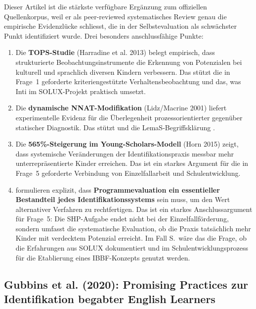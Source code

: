 \documentclass[ngerman, a4paper]{article}
\begin{document}
Dieser Artikel ist die stärkste verfügbare Ergänzung zum offiziellen
Quellenkorpus, weil er als peer-reviewed systematisches Review genau die
empirische Evidenzlücke schliesst, die in der Selbstevaluation als
schwächster Punkt identifiziert wurde. Drei besonders anschlussfähige
Punkte:

\begin{enumerate}
  \item Die \textbf{TOPS-Studie} (Harradine et al. 2013) belegt
    empirisch, dass strukturierte Beobachtungsinstrumente die Erkennung
    von Potenzialen bei kulturell und sprachlich diversen Kindern
    verbessern. Das stützt die in Frage~1 geforderte kriteriengestützte
    Verhaltensbeobachtung und das, was Inti im SOLUX-Projekt praktisch
    umsetzt.
  \item Die \textbf{dynamische NNAT-Modifikation} (Lidz/Macrine 2001)
    liefert experimentelle Evidenz für die Überlegenheit
    prozessorientierter gegenüber statischer Diagnostik. Das stützt
    \textcite[S.\,274--303]{preckel2021tad} und die LemaS-Begriffsklärung
    \parencite{lemas2023begriffsklaerung}.
  \item Die \textbf{565\%-Steigerung im Young-Scholars-Modell} (Horn
    2015) zeigt, dass systemische Veränderungen der
    Identifikationspraxis messbar mehr unterrepräsentierte Kinder
    erreichen. Das ist ein starkes Argument für die in Frage~5
    geforderte Verbindung von Einzelfallarbeit und Schulentwicklung.
  \item \textcite[S.\,325]{mun2020identifying} formulieren explizit, dass \textbf{Programmevaluation
    ein essentieller Bestandteil jedes Identifikationssystems} sein muss,
    um den Wert alternativer Verfahren zu rechtfertigen. Das ist ein
    starkes Anschlussargument für Frage~5: Die SHP-Aufgabe endet nicht bei
    der Einzelfallförderung, sondern umfasst die systematische Evaluation,
    ob die Praxis tatsächlich mehr Kinder mit verdecktem Potenzial
    erreicht. Im Fall S.\ wäre das die Frage, ob die Erfahrungen aus SOLUX
    dokumentiert und im Schulentwicklungsprozess für die Etablierung eines
    IBBF-Konzepts genutzt werden.
\end{enumerate}


\subsection*{Gubbins et al. (2020): Promising Practices zur Identifikation
  begabter English Learners}
\label{subsec:gubbins2020}
\end{document}
